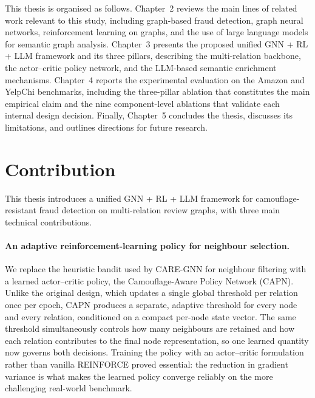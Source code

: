 This thesis is organised as follows. Chapter~2 reviews the main lines of related work relevant to this study, including graph-based fraud detection, graph neural networks, reinforcement learning on graphs, and the use of large language models for semantic graph analysis. Chapter~3 presents the proposed unified GNN + RL + LLM framework and its three pillars, describing the multi-relation backbone, the actor--critic policy network, and the LLM-based semantic enrichment mechanisms. Chapter~4 reports the experimental evaluation on the Amazon and YelpChi benchmarks, including the three-pillar ablation that constitutes the main empirical claim and the nine component-level ablations that validate each internal design decision. Finally, Chapter~5 concludes the thesis, discusses its limitations, and outlines directions for future research.


\section{Contribution}

This thesis introduces a unified GNN + RL + LLM framework for camouflage-resistant fraud detection on multi-relation review graphs, with three main technical contributions.

  \paragraph{An adaptive reinforcement-learning policy for neighbour selection.}
  We replace the heuristic bandit used by CARE-GNN for neighbour filtering with
  a learned actor--critic policy, the Camouflage-Aware Policy Network (CAPN).
  Unlike the original design, which updates a single global threshold per
  relation once per epoch, CAPN produces a separate, adaptive threshold for
  every node and every relation, conditioned on a compact per-node state
  vector. The same threshold simultaneously controls how many neighbours are
  retained and how each relation contributes to the final node representation,
  so one learned quantity now governs both decisions. Training the policy
  with an actor--critic formulation rather than vanilla REINFORCE proved
  essential: the reduction in gradient variance is what makes the learned
  policy converge reliably on the more challenging real-world benchmark.

